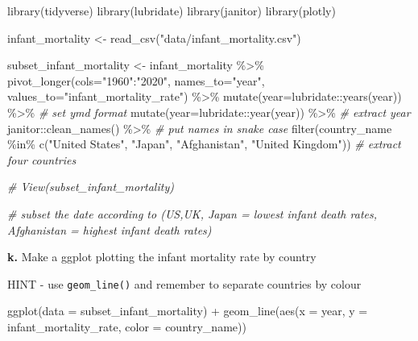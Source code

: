 \documentclass[
]{book}
\newenvironment{Shaded}{\begin{snugshade}}{\end{snugshade}}
\newcommand{\AttributeTok}[1]{\textcolor[rgb]{0.77,0.63,0.00}{#1}}
\newcommand{\CommentTok}[1]{\textcolor[rgb]{0.56,0.35,0.01}{\textit{#1}}}
\newcommand{\FunctionTok}[1]{\textcolor[rgb]{0.00,0.00,0.00}{#1}}
\newcommand{\NormalTok}[1]{#1}
\newcommand{\OtherTok}[1]{\textcolor[rgb]{0.56,0.35,0.01}{#1}}
\newcommand{\SpecialCharTok}[1]{\textcolor[rgb]{0.00,0.00,0.00}{#1}}
\newcommand{\StringTok}[1]{\textcolor[rgb]{0.31,0.60,0.02}{#1}}
\begin{document}
\begin{Shaded}
\begin{Highlighting}[]
\FunctionTok{library}\NormalTok{(tidyverse)}
\FunctionTok{library}\NormalTok{(lubridate)}
\FunctionTok{library}\NormalTok{(janitor)}
\FunctionTok{library}\NormalTok{(plotly)}

\NormalTok{infant\_mortality }\OtherTok{\textless{}{-}} \FunctionTok{read\_csv}\NormalTok{(}\StringTok{"data/infant\_mortality.csv"}\NormalTok{) }

\NormalTok{subset\_infant\_mortality }\OtherTok{\textless{}{-}}\NormalTok{ infant\_mortality }\SpecialCharTok{\%\textgreater{}\%}
  \FunctionTok{pivot\_longer}\NormalTok{(}\AttributeTok{cols=}\StringTok{"1960"}\SpecialCharTok{:}\StringTok{"2020"}\NormalTok{, }
               \AttributeTok{names\_to=}\StringTok{"year"}\NormalTok{,               }
               \AttributeTok{values\_to=}\StringTok{"infant\_mortality\_rate"}\NormalTok{) }\SpecialCharTok{\%\textgreater{}\%}
  \FunctionTok{mutate}\NormalTok{(}\AttributeTok{year=}\NormalTok{lubridate}\SpecialCharTok{::}\FunctionTok{years}\NormalTok{(year)) }\SpecialCharTok{\%\textgreater{}\%} \CommentTok{\# set ymd format}
  \FunctionTok{mutate}\NormalTok{(}\AttributeTok{year=}\NormalTok{lubridate}\SpecialCharTok{::}\FunctionTok{year}\NormalTok{(year)) }\SpecialCharTok{\%\textgreater{}\%} \CommentTok{\# extract year}
\NormalTok{  janitor}\SpecialCharTok{::}\FunctionTok{clean\_names}\NormalTok{() }\SpecialCharTok{\%\textgreater{}\%} \CommentTok{\# put names in snake case}
  \FunctionTok{filter}\NormalTok{(country\_name }\SpecialCharTok{\%in\%} 
           \FunctionTok{c}\NormalTok{(}\StringTok{"United States"}\NormalTok{, }
             \StringTok{"Japan"}\NormalTok{, }
             \StringTok{"Afghanistan"}\NormalTok{, }
             \StringTok{"United Kingdom"}\NormalTok{)) }\CommentTok{\# extract four countries}

\CommentTok{\# View(subset\_infant\_mortality)}

\CommentTok{\# subset the date according to (US,UK, Japan = lowest infant death rates, Afghanistan = highest infant death rates)}
\end{Highlighting}
\end{Shaded}

\textbf{k.} Make a ggplot plotting the infant mortality rate by country

HINT - use \texttt{geom\_line()} and remember to separate countries by colour

\begin{Shaded}
\begin{Highlighting}[]
\FunctionTok{ggplot}\NormalTok{(}\AttributeTok{data =}\NormalTok{ subset\_infant\_mortality) }\SpecialCharTok{+}
  \FunctionTok{geom\_line}\NormalTok{(}\FunctionTok{aes}\NormalTok{(}\AttributeTok{x =}\NormalTok{ year,}
                 \AttributeTok{y =}\NormalTok{ infant\_mortality\_rate,}
                 \AttributeTok{color =}\NormalTok{ country\_name))}
\end{Highlighting}
\end{Shaded}
\end{document}
